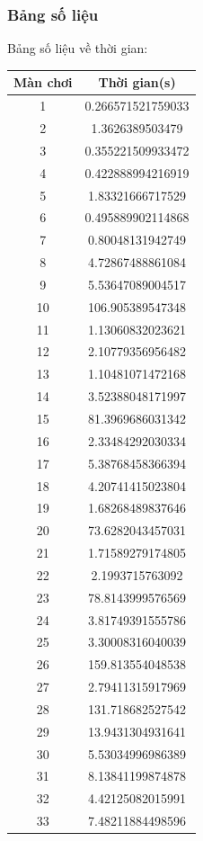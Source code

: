 \documentclass[a4paper, 11pt]{article}
\begin{document}
\subsubsection{Bảng số liệu}
Bảng số liệu về thời gian:
\begin{center}
	\begin{tabular}{|c|c|}
		\hline
		Màn chơi & Thời gian(s)      \\ \hline
		1        & 0.266571521759033 \\ \hline
		2        & 1.3626389503479   \\ \hline
		3        & 0.355221509933472 \\ \hline
		4        & 0.422888994216919 \\ \hline
		5        & 1.83321666717529  \\ \hline
		6        & 0.495889902114868 \\ \hline
		7        & 0.80048131942749  \\ \hline
		8        & 4.72867488861084  \\ \hline
		9        & 5.53647089004517  \\ \hline
		10       & 106.905389547348  \\ \hline
		11       & 1.13060832023621  \\ \hline
		12       & 2.10779356956482  \\ \hline
		13       & 1.10481071472168  \\ \hline
		14       & 3.52388048171997  \\ \hline
		15       & 81.3969686031342  \\ \hline
		16       & 2.33484292030334  \\ \hline
		17       & 5.38768458366394  \\ \hline
		18       & 4.20741415023804  \\ \hline
		19       & 1.68268489837646  \\ \hline
		20       & 73.6282043457031  \\ \hline
		21       & 1.71589279174805  \\ \hline
		22       & 2.1993715763092   \\ \hline
		23       & 78.8143999576569  \\ \hline
		24       & 3.81749391555786  \\ \hline
		25       & 3.30008316040039  \\ \hline
		26       & 159.813554048538  \\ \hline
		27       & 2.79411315917969  \\ \hline
		28       & 131.718682527542  \\ \hline
		29       & 13.9431304931641  \\ \hline
		30       & 5.53034996986389  \\ \hline
		31       & 8.13841199874878  \\ \hline
		32       & 4.42125082015991  \\ \hline
		33       & 7.48211884498596  \\ \hline
	\end{tabular}
\end{center}
\end{document}
